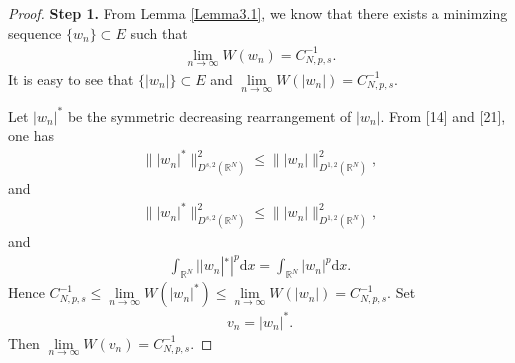 \documentclass[12pt,a4paper,reqno]{amsart}
\numberwithin{equation}{section}
\begin{document}
\begin{proof}
{\bf Step 1.}
From Lemma \ref{Lemma3.1}, we know that there exists a minimzing sequence $\{w_{n}\}\subset E$ such that
\begin{equation*}
\begin{aligned}
\lim\limits_{n\to\infty}
W(w_{n})=C_{N,p,s}^{-1}.
\end{aligned}
\end{equation*}
It is easy to see that $\{|w_{n}|\}\subset E$ and $\lim\limits_{n\to\infty}
W(|w_{n}|)=C_{N,p,s}^{-1}$.

Let $|w_{n}|^{*}$ be the symmetric decreasing rearrangement of $|w_{n}|$.
From [14] and [21], one has
\begin{equation*}
\begin{aligned}
\||w_{n}|^{*}\|_{D^{s,2}(\mathbb{R}^{N})}^{2}
\leqslant
\||w_{n}|\|_{D^{1,2}(\mathbb{R}^{N})}^{2},
\end{aligned}
\end{equation*}
and
\begin{equation*}
\begin{aligned}
\||w_{n}|^{*}\|_{D^{s,2}(\mathbb{R}^{N})}^{2}
\leqslant
\||w_{n}|\|_{D^{1,2}(\mathbb{R}^{N})}^{2},
\end{aligned}
\end{equation*}
and
\begin{equation*}
\begin{aligned}
\int_{\mathbb{R}^{N}}
||w_{n}|^{*}|^{p}
\mathrm{d}x
=
\int_{\mathbb{R}^{N}}
|w_{n}|^{p}
\mathrm{d}x.
\end{aligned}
\end{equation*}
Hence
$C_{N,p,s}^{-1}\leqslant\lim\limits_{n\to\infty}
W(|w_{n}|^{*})\leqslant\lim\limits_{n\to\infty}
W(|w_{n}|)=C_{N,p,s}^{-1}$.
Set
\begin{equation*}
\begin{aligned}
v_{n}=|w_{n}|^{*}.
\end{aligned}
\end{equation*}
Then $\lim\limits_{n\to\infty}
W(v_{n})=C_{N,p,s}^{-1}$.



\end{proof}
\end{document}
